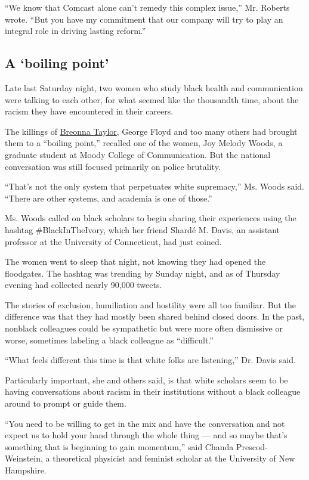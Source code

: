 ``We know that Comcast alone can't remedy this complex issue,'' Mr.
Roberts wrote. ``But you have my commitment that our company will try to
play an integral role in driving lasting reform.''

\hypertarget{a-boiling-point}{%
\subsection{A `boiling point'}\label{a-boiling-point}}

Late last Saturday night, two women who study black health and
communication were talking to each other, for what seemed like the
thousandth time, about the racism they have encountered in their
careers.

The killings of
\href{https://www.nytimes3xbfgragh.onion/article/breonna-taylor-police.html}{Breonna
Taylor}, George Floyd and too many others had brought them to a
``boiling point,'' recalled one of the women, Joy Melody Woods, a
graduate student at Moody College of Communication. But the national
conversation was still focused primarily on police brutality.

``That's not the only system that perpetuates white supremacy,'' Ms.
Woods said. ``There are other systems, and academia is one of those.''

Ms. Woods called on black scholars to begin sharing their experiences
using the hashtag \#BlackInTheIvory, which her friend Shardé M. Davis,
an assistant professor at the University of Connecticut, had just
coined.

The women went to sleep that night, not knowing they had opened the
floodgates. The hashtag was trending by Sunday night, and as of Thursday
evening had collected nearly 90,000 tweets.

The stories of exclusion, humiliation and hostility were all too
familiar. But the difference was that they had mostly been shared behind
closed doors. In the past, nonblack colleagues could be sympathetic but
were more often dismissive or worse, sometimes labeling a black
colleague as ``difficult.''

``What feels different this time is that white folks are listening,''
Dr. Davis said.

Particularly important, she and others said, is that white scholars seem
to be having conversations about racism in their institutions without a
black colleague around to prompt or guide them.

``You need to be willing to get in the mix and have the conversation and
not expect us to hold your hand through the whole thing --- and so maybe
that's something that is beginning to gain momentum,'' said Chanda
Prescod-Weinstein, a theoretical physicist and feminist scholar at the
University of New Hampshire.

